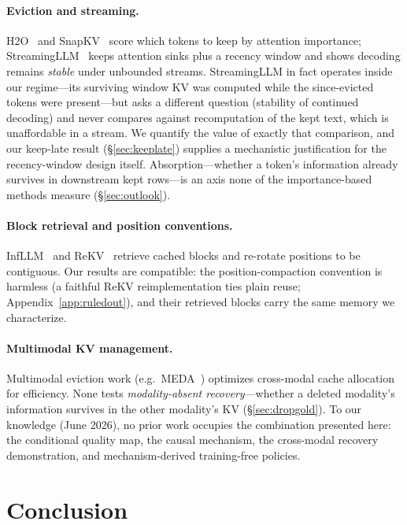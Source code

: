 \documentclass[11pt]{article}
\begin{document}
\paragraph{Eviction and streaming.}
H2O~\cite{h2o} and SnapKV~\cite{snapkv} score which tokens to keep by attention importance; StreamingLLM~\cite{streamingllm} keeps attention sinks plus a recency window and shows decoding remains \emph{stable} under unbounded streams. StreamingLLM in fact operates inside our regime---its surviving window KV was computed while the since-evicted tokens were present---but asks a different question (stability of continued decoding) and never compares against recomputation of the kept text, which is unaffordable in a stream. We quantify the value of exactly that comparison, and our keep-late result (\S\ref{sec:keeplate}) supplies a mechanistic justification for the recency-window design itself. Absorption---whether a token's information already survives in downstream kept rows---is an axis none of the importance-based methods measure (\S\ref{sec:outlook}).

\paragraph{Block retrieval and position conventions.}
InfLLM~\cite{infllm} and ReKV~\cite{rekv} retrieve cached blocks and re-rotate positions to be contiguous. Our results are compatible: the position-compaction convention is harmless (a faithful ReKV reimplementation ties plain reuse; Appendix~\ref{app:ruledout}), and their retrieved blocks carry the same memory we characterize.

\paragraph{Multimodal KV management.}
Multimodal eviction work (e.g.\ MEDA~\cite{meda}) optimizes cross-modal cache allocation for efficiency. None tests \emph{modality-absent recovery}---whether a deleted modality's information survives in the other modality's KV (\S\ref{sec:dropgold}). To our knowledge (June 2026), no prior work occupies the combination presented here: the conditional quality map, the causal mechanism, the cross-modal recovery demonstration, and mechanism-derived training-free policies.

\section{Conclusion}
\end{document}
